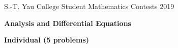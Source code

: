 \documentclass[10pt]{article}
\begin{document}



\begin{center}
S.-T. Yau College Student Mathematics Contests 2019

\vspace{0.1cm}

\Large {\bf Analysis and Differential Equations}

\vspace{0.1cm}

\large {\bf Individual (5 problems)}

\vspace{0.1cm}
\end{center}
\end{document}
